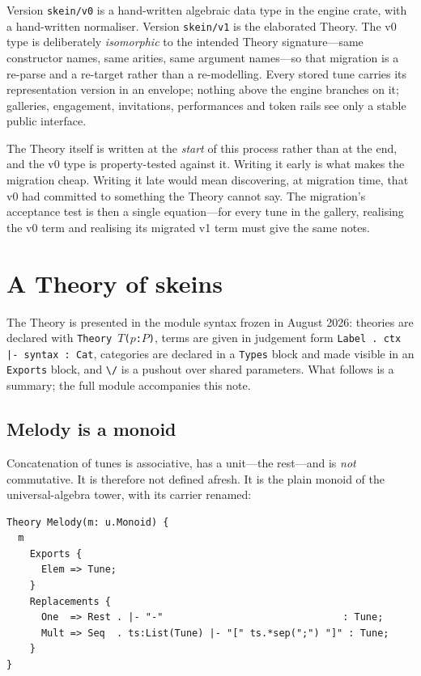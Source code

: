 \documentclass[11pt,a4paper]{article}
\theoremstyle{definition}
\theoremstyle{plain}
\begin{document}
Version \texttt{skein/v0} is a hand-written algebraic data type in the engine crate, with a
hand-written normaliser. Version \texttt{skein/v1} is the elaborated Theory. The v0 type is
deliberately \emph{isomorphic} to the intended Theory signature---same constructor names, same
arities, same argument names---so that migration is a re-parse and a re-target rather than a
re-modelling. Every stored tune carries its representation version in an envelope; nothing above
the engine branches on it; galleries, engagement, invitations, performances and token rails see
only a stable public interface.

The Theory itself is written at the \emph{start} of this process rather than at the end, and the v0
type is property-tested against it. Writing it early is what makes the migration cheap. Writing it
late would mean discovering, at migration time, that v0 had committed to something the Theory
cannot say. The migration's acceptance test is then a single equation---for every tune in the
gallery, realising the v0 term and realising its migrated v1 term must give the same notes.

\section{A Theory of skeins}
\label{sec:theory}

The Theory is presented in the module syntax frozen in August 2026: theories are declared with
\texttt{Theory $T$($p$:$P$)}, terms are given in judgement form \texttt{Label . ctx |- syntax :
Cat}, categories are declared in a \texttt{Types} block and made visible in an \texttt{Exports}
block, and \texttt{\textbackslash/} is a pushout over shared parameters. What follows is a summary;
the full module accompanies this note.

\subsection{Melody is a monoid}

Concatenation of tunes is associative, has a unit---the rest---and is \emph{not} commutative. It is
therefore not defined afresh. It is the plain monoid of the universal-algebra tower, with its
carrier renamed:

\begin{lstlisting}
Theory Melody(m: u.Monoid) {
  m
    Exports {
      Elem => Tune;
    }
    Replacements {
      One  => Rest . |- "-"                               : Tune;
      Mult => Seq  . ts:List(Tune) |- "[" ts.*sep(";") "]" : Tune;
    }
}
\end{lstlisting}
\end{document}
